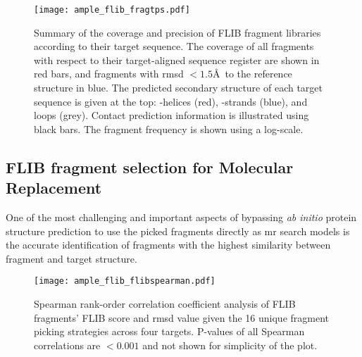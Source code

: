 \begin{figure}[H]
	\centering
	\texttt{[image: ample\_flib\_fragtps.pdf]}
	\caption[Coverage and precision of Flib fragment libraries]{Summary of the coverage and precision of FLIB fragment libraries according to their target sequence. The coverage of all fragments with respect to their target-aligned sequence register are shown in red bars, and fragments with \gls{rmsd} $<1.5$\AA\ to the reference structure in blue. The predicted secondary structure of each target sequence is given at the top: \textalpha-helices (red), \textbeta-strands (blue), and loops (grey). Contact prediction information is illustrated using black bars. The fragment frequency is shown using a log-scale.}
	\label{fig:ample_flib_fragtps}
\end{figure}

\subsection{FLIB fragment selection for Molecular Replacement}
One of the most challenging and important aspects of bypassing \textit{ab initio} protein structure prediction to use the picked fragments directly as \gls{mr} search models is the accurate identification of fragments with the highest similarity between fragment and target structure.

\begin{figure}[H]
	\centering
	\texttt{[image: ample\_flib\_flibspearman.pdf]}
        \caption[Spearman rank-order correlation coefficient analysis of FLIB fragments]{Spearman rank-order correlation coefficient analysis of FLIB fragments' FLIB score and \gls{rmsd} value given the 16 unique fragment picking strategies across four targets. P-values of all Spearman correlations are $<0.001$ and not shown for simplicity of the plot.}
	\label{fig:ample_flib_flibspearman}
\end{figure}

